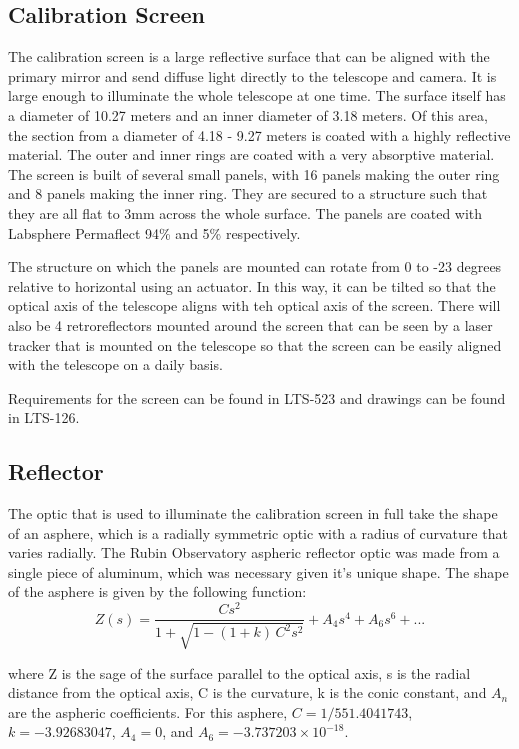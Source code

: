 \documentclass[SE,authoryear,lsstdraft,toc]{lsstdoc}
\begin{document}
\subsection{Calibration Screen}
The calibration screen is a large reflective surface that can be aligned with the primary mirror and send diffuse light directly to the telescope and camera. It is large enough to illuminate the whole telescope at one time. The surface itself has a diameter of 10.27 meters and an inner diameter of 3.18 meters. Of this area, the section from a diameter of 4.18 - 9.27 meters is coated with a highly reflective material. The outer and inner rings are coated with a very absorptive material. The screen is built of several small panels, with 16 panels making the outer ring and 8 panels making the inner ring. They are secured to a structure such that they are all flat to 3mm across the whole surface. The panels are coated with Labsphere Permaflect 94\% and 5\% respectively. 

The structure on which the panels are mounted can rotate from 0 to -23 degrees relative to horizontal using an actuator. In this way, it can be tilted so that the optical axis of the telescope aligns with teh optical axis of the screen. There will also be 4 retroreflectors mounted around the screen that can be seen by a laser tracker that is mounted on the telescope so that the screen can be easily aligned with the telescope on a daily basis. 

Requirements for the screen can be found in LTS-523 and drawings can be found in LTS-126.

\subsection{Reflector}
The optic that is used to illuminate the calibration screen in full take the shape of an asphere, which is a radially symmetric optic with a radius of curvature that varies radially. The Rubin Observatory aspheric reflector optic was made from a single piece of aluminum, which was necessary given it's unique shape. The shape of the asphere is given by the following function:
\begin{equation}
Z(s) = \frac{C s^{2}}{1+\sqrt{1-(1+k)\,C^{2}s^{2}}} + A_{4}s^{4} + A_{6}s^{6} + ...
\end{equation}


where Z is the sage of the surface parallel to the optical axis, s is the radial distance from the optical axis, C is the curvature, k is the conic constant, and $A_{n}$ are the aspheric coefficients.
 For this asphere, $C=1/551.4041743$, $k=-3.92683047$, $A_{4}=0$, and $A_{6} = -3.737203\times10^{-18}$.
\end{document}
